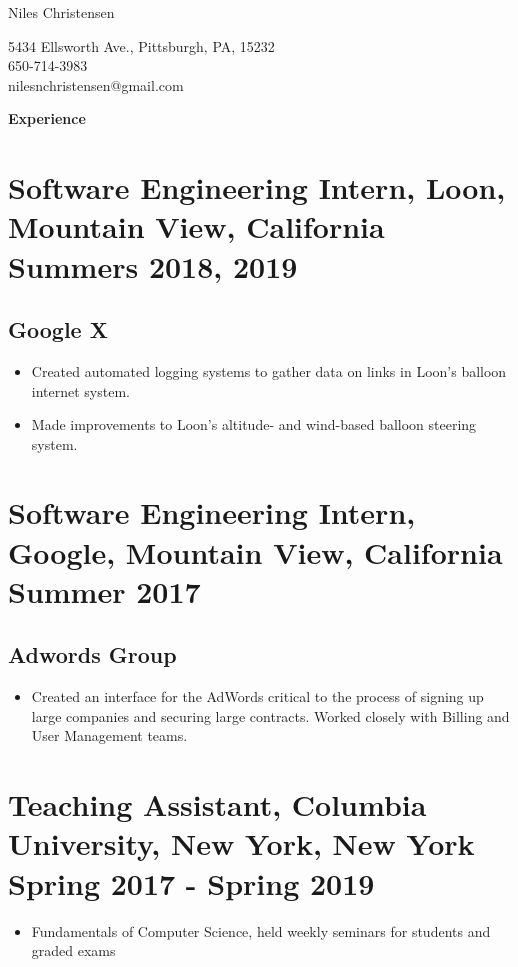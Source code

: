 \documentclass{article}
\newenvironment{tightcenter}{%
  \setlength\topsep{0pt}
  \setlength\parskip{0pt}
  \begin{center}
}{%
  \end{center}
}
\begin{document}
\begin{tightcenter}
\begin{Large}Niles Christensen\\
\end{Large}
\begin{small}
5434 Ellsworth Ave., Pittsburgh, PA, 15232\\
650-714-3983\\
nilesnchristensen@gmail.com
\end{small}
\end{tightcenter}

\noindent
\large{\textbf{Experience}}
\section*{\textbf{Software Engineering Intern, Loon, Mountain View, California \hfill Summers 2018, 2019}}
\subsection*{Google X}
\begin{itemize}[noitemsep]
    \item Created automated logging systems to gather data on links in Loon’s balloon internet system.
    \item Made improvements to Loon's altitude- and wind-based balloon steering system.
\end{itemize}

\section*{\textbf{Software Engineering Intern, Google, Mountain View, California \hfill Summer 2017}}
\subsection*{Adwords Group}
\begin{itemize}
    \item Created an interface for the AdWords critical to the process of signing up large companies and securing large contracts. Worked closely with Billing and User Management teams.
\end{itemize}

\section*{\textbf{Teaching Assistant, Columbia University, New York, New York \hfill	Spring 2017 - Spring 2019
}}
\begin{itemize}
    \item Fundamentals of Computer Science, held weekly seminars for students and graded exams
\end{itemize}
 
\end{document}
